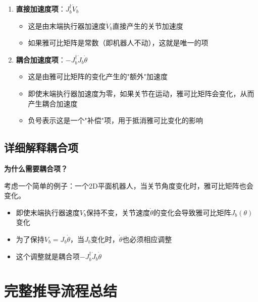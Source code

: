 \documentclass{article}
\begin{document}
\begin{enumerate}
\item \textbf{直接加速度项}：$J_b^{\dagger}\dot{V}_b$
\begin{itemize}
\item 这是由末端执行器加速度$\dot{V}_b$直接产生的关节加速度
\item 如果雅可比矩阵是常数（即机器人不动），这就是唯一的项
\end{itemize}

\item \textbf{耦合加速度项}：$-J_b^{\dagger}\dot{J}_b\dot{\theta}$
\begin{itemize}
\item 这是由雅可比矩阵的变化产生的"额外"加速度
\item 即使末端执行器加速度为零，如果关节在运动，雅可比矩阵会变化，从而产生耦合加速度
\item 负号表示这是一个"补偿"项，用于抵消雅可比变化的影响
\end{itemize}
\end{enumerate}

\subsection{详细解释耦合项}

\textbf{为什么需要耦合项？}

考虑一个简单的例子：一个2D平面机器人，当关节角度变化时，雅可比矩阵也会变化。

\begin{itemize}
\item 即使末端执行器速度$V_b$保持不变，关节速度$\dot{\theta}$的变化会导致雅可比矩阵$J_b(\theta)$变化
\item 为了保持$V_b = J_b\dot{\theta}$，当$J_b$变化时，$\dot{\theta}$也必须相应调整
\item 这个调整就是耦合项$-J_b^{\dagger}\dot{J}_b\dot{\theta}$
\end{itemize}

\section{完整推导流程总结}
\end{document}
